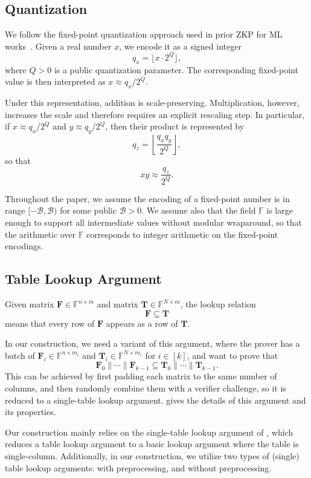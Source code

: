 \subsection{Quantization}

We follow the fixed-point quantization approach used in prior ZKP for ML works~\cite{sparrow24,zkdt20,zkboost26}. 
Given a real number $x$, we encode it as a signed integer
\[
q_x = \lfloor x \cdot 2^Q \rfloor,
\]
where $Q>0$ is a public quantization parameter. The corresponding fixed-point value is then interpreted as $x \approx q_x / 2^Q$.

Under this representation, addition is scale-preserving.
Multiplication, however, increases the scale and therefore requires an explicit
rescaling step. In particular, if
$x \approx q_x/2^Q$ and $y \approx q_y/2^Q$, then their product is represented by
\[
q_z = \left\lfloor \frac{q_x q_y}{2^Q} \right\rfloor,
\]
so that
\[
xy \approx \frac{q_z}{2^Q}.
\]

Throughout the paper, we assume the encoding of a fixed-point number
    is in range $[-\mathcal{B}, \mathcal{B})$ for some public $\mathcal{B}>0$.
    We assume also that the field $\mathbb{F}$ is large enough to support all intermediate values without modular wraparound, so that the arithmetic over $\mathbb{F}$ corresponds to integer arithmetic on the fixed-point encodings.

\subsection{Table Lookup Argument}
Given matrix $\mathbf{F}\in \mathbb{F}^{n\times m}$
    and matrix $\mathbf{T}\in \mathbb{F}^{N\times m}$,
    the lookup relation
    \[\mathbf{F}\subseteq \mathbf{T}\]
    means that every row of $\mathbf{F}$ appears as a row of $\mathbf{T}$.


In our construction, we need a variant of this argument,
    where the prover has a batch of $\mathbf{F}_i\in \mathbb{F}^{n\times m_i}$
    and $\mathbf{T}_i \in \mathbb{F}^{N\times m_i}$
    for $i\in [k]$,
    and want to prove that
    \[\mathbf{F}_0\| \cdots \| \mathbf{F}_{k-1} \subseteq \mathbf{T}_0\| \cdots \| \mathbf{T}_{k-1}.\]
    This can be achieved by first padding each matrix to the same
    number of columns,
    and then randomly combine them with a verifier challenge,
    so it is reduced to a single-table lookup argument.
     gives the details of this argument and its properties.

Our construction mainly relies on the single-table lookup argument of \citet{cq++24},
    which reduces a table lookup argument to a basic lookup argument
    where the table is single-column.
    Additionally, in our construction, we utilize
    two types of (single) table lookup arguments:
    with preprocessing, and without preprocessing.
    
